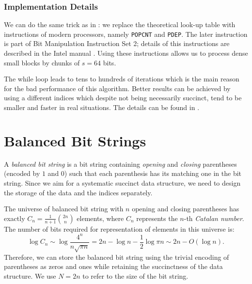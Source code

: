 \subsubsection{Implementation Details}

We can do the same trick as in \rank{}: we replace the theoretical look-up table with instructions of modern processors, namely \verb|POPCNT| and \verb|PDEP|.
The later instruction is part of Bit Manipulation Instruction Set 2; details of this instructions are described in the Intel manual \cite{intelsys}.
Using these instructions allows us to process dense small blocks by chunks of $s = 64$ bits.

The while loop leads to tens to hundreds of iterations which is the main reason for the bad performance of this algorithm.
Better results can be achieved by using a different indices which despite not being necessarily succinct, tend to be smaller and faster in real situations.
The details can be found in \cite{kim2005efficient}.


\section{Balanced Bit Strings}

A \emph{balanced bit string} is a bit string containing \emph{opening} and \emph{closing} parentheses (encoded by $1$ and $0$) such that each parenthesis has its matching one in the bit string.
Since we aim for a systematic succinct data structure, we need to design the storage of the data and the indices separately.

The universe of balanced bit string with $n$ opening and closing parentheses has exactly $C_n = \frac{1}{n+1} {2n \choose n}$ elements, where $C_n$ represents the $n$-th \emph{Catalan number}.
The number of bits required for representation of elements in this universe is:
$$ \log C_n \sim \log \frac{4^n}{n \sqrt{\pi n}} = 2n - \log n - \frac{1}{2} \log{\pi n} \sim 2n - O(\log n). $$
Therefore, we can store the balanced bit string using the trivial encoding of parentheses as zeros and ones while retaining the succinctness of the data structure.
We use $N = 2n$ to refer to the size of the bit string.

